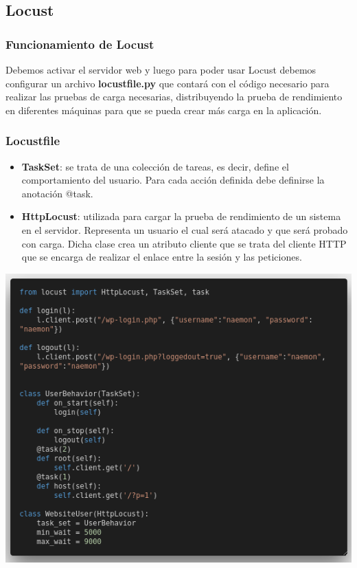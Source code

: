 \documentclass{beamer}
\theoremstyle{plain}
\theoremstyle{definition}
\theoremstyle{plain}
\theoremstyle{definition}
\theoremstyle{remark}
\theoremstyle{definition}
\begin{document}
\subsection{Locust}
\begin{frame}
	\frametitle{Funcionamiento de Locust}
	Debemos activar el servidor web y luego para poder usar Locust debemos configurar un archivo \textbf{locustfile.py} que contará con el código necesario para realizar las pruebas de carga necesarias, distribuyendo la prueba de rendimiento en diferentes máquinas para que se
	pueda crear más carga en la aplicación.
	
\end{frame}
\begin{frame}
	\frametitle{Locustfile}
	\begin{itemize}
		\item \textbf{TaskSet}: se trata de una colección de tareas, es decir, define el comportamiento del usuario. Para cada acción definida debe definirse la anotación @task.
		\item \textbf{HttpLocust}: utilizada para cargar la prueba de rendimiento de un sistema en el servidor. Representa un usuario el cual será atacado y que será probado con carga. Dicha clase crea un atributo cliente que se trata del cliente HTTP que se encarga de realizar el enlace entre la
		sesión y las peticiones.
	\end{itemize}
\end{frame}
\begin{frame}
		\centering
	\includegraphics[scale=0.15]{imagenes/locustfile.png}
\end{frame}
\end{document}

